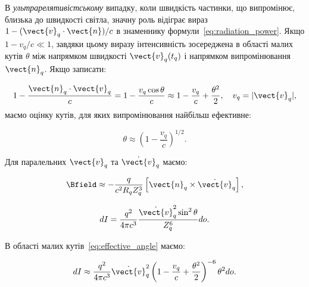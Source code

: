 В \emph{ультрарелятивістському} випадку, коли швидкість частинки, що випромінює, близька до швидкості світла, значну
роль відіграє вираз \( 1 - (\vect{v}_q \cdot \vect{n}) / c \) в знаменнику формули~\eqref{eq:radiation_power}. Якщо
\( 1 - {v_q}/{c} \ll 1 \), завдяки цьому виразу інтенсивність зосереджена в області малих кутів \( \theta \) між
напрямком швидкості \( \vect{v}_q(t_q) \) і напрямком випромінювання \( \vect{n}_q \). Якщо записати:

\begin{equation*}
	1 - \frac{\vect{n}_q \cdot \vect{v}_q}{c} = 1 - \frac{v_q \cos \theta}{c} \approx 1 - \frac{v_q}{c} + \frac{\theta^2}{2}, \quad v_q = |\vect{v}_q|,
\end{equation*}
%
маємо оцінку кутів, для яких випромінювання найбільш ефективне:

\begin{equation}
	\theta \approx \left( 1 - \frac{v_q}{c} \right)^{1/2}.
	\label{eq:effective_angle}
\end{equation}

Для паралельних \( \vect{v}_q \) та \( \dot{\vect{v}}_q \) маємо:

\begin{equation*}
	\Bfield \approx -\frac{q}{c^2 R_q Z_q^3} \left[ \vect{n}_q \times \dot{\vect{v}}_q \right],
\end{equation*}

\begin{equation}
	dI = \frac{q^2}{4\pi c^3} \frac{\dot{\vect{v}}_q^2 \sin^2 \theta}{Z_q^6} do.
	\label{eq:radiation_power_parallel}
\end{equation}

В області малих кутів~\eqref{eq:effective_angle} маємо:

\begin{equation*}
	dI \approx \frac{q^2}{4\pi c^3} \dot{\vect{v}}_q^2 \left( 1 - \frac{v_q}{c} + \frac{\theta^2}{2} \right)^{-6} \theta^2 do.
\end{equation*}

